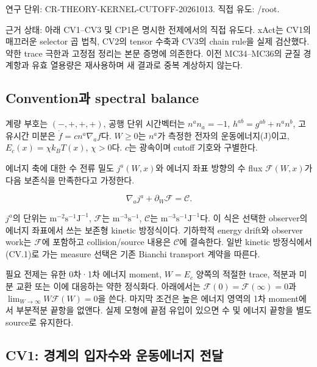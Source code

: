 \documentclass[11pt,a4paper]{article}
\begin{document}
연구 단위: CR-THEORY-KERNEL-CUTOFF-20261013. 직접 유도: /root.

근거 상태: 아래 CV1--CV3 및 CP1은 명시한 전제에서의 직접 유도다. xAct는 CV1의 매끄러운 selector 곱 법칙, CV2의 tensor 수축과 CV3의 chain rule을 실제 검산했다. 약한 trace 극한과 고정점 정리는 본문 증명에 의존한다. 이전 MC34--MC36의 균질 경계항과 유효 열용량은 재사용하며 새 결과로 중복 계상하지 않는다.

\hypertarget{conventionuxacfc-spectral-balance}{%
\subsection{Convention과 spectral balance}\label{conventionuxacfc-spectral-balance}}

계량 부호는 \((-,+,+,+)\), 공행 단위 시간벡터는 \(n^an_a=-1\), \(h^{ab}=g^{ab}+n^an^b\), 고유시간 미분은 \(\dot f=c n^a\nabla_af\)다. \(W\ge0\)는 \(n^a\)가 측정한 전자의 운동에너지(J)이고, \(E_c(x)=\chi k_BT(x)\), \(\chi>0\)다. \(c\)는 광속이며 cutoff 기호와 구별한다.

에너지 축에 대한 수 전류 밀도 \(j^a(W,x)\)와 에너지 좌표 방향의 수 flux \(\mathcal F(W,x)\)가 다음 보존식을 만족한다고 가정한다.

\[
\nabla_a j^a+\partial_W\mathcal F=\mathcal C.
\tag{CV.1}
\]

\(j^a\)의 단위는 \(\mathrm{m^{-2}s^{-1}J^{-1}}\), \(\mathcal F\)는 \(\mathrm{m^{-3}s^{-1}}\), \(\mathcal C\)는 \(\mathrm{m^{-3}s^{-1}J^{-1}}\)다. 이 식은 선택한 observer의 에너지 좌표에서 쓰는 보존형 kinetic 방정식이다. 기하학적 energy drift와 observer work는 \(\mathcal F\)에 포함하고 collision/source 내용은 \(\mathcal C\)에 결속한다. 일반 kinetic 방정식에서 (CV.1)로 가는 measure 선택은 기존 Bianchi transport 계약을 따른다.

필요 전제는 유한 0차·1차 에너지 moment, \(W=E_c\) 양쪽의 적절한 trace, 적분과 미분 교환 또는 이에 대응하는 약한 정식화다. 아래에서는 \(\mathcal F(0)=\mathcal F(\infty)=0\)과 \(\lim_{W\to\infty}W\mathcal F(W)=0\)을 쓴다. 마지막 조건은 높은 에너지 영역의 1차 moment에서 부분적분 끝항을 없앤다. 실제 모형에 끝점 유입이 있으면 수 및 에너지 끝항을 별도 source로 유지한다.

\hypertarget{cv1-uxacbduxacc4uxc758-uxc785uxc790uxc218uxc640-uxc6b4uxb3d9uxc5d0uxb108uxc9c0-uxc804uxb2ec}{%
\subsection{CV1: 경계의 입자수와 운동에너지 전달}\label{cv1-uxacbduxacc4uxc758-uxc785uxc790uxc218uxc640-uxc6b4uxb3d9uxc5d0uxb108uxc9c0-uxc804uxb2ec}}
\end{document}
